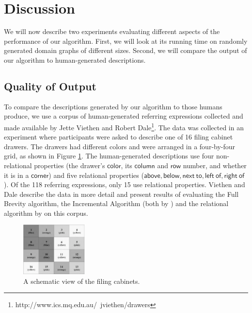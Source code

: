 \section{Discussion} \label{sec:discussion}

We will now describe two experiments evaluating different aspects of
the performance of our algorithm. First, we will look at its running
time on randomly generated domain graphs of different sizes. Second,
we will compare the output of our algorithm to human-generated
descriptions.



\subsection{Quality of Output}

To compare the descriptions generated by our algorithm to
those humans produce, we use a corpus of
human-generated referring expressions collected and made available by
Jette Viethen and Robert
Dale\footnote{http://www.ics.mq.edu.au/~jviethen/drawers}.  The data
was collected in an experiment where participants were asked to
describe one of 16 filing cabinet drawers. The drawers had different
colors and were arranged in a four-by-four grid, as shown in Figure
\ref{fig:drawers}. The human-generated descriptions use four
non-relational properties (the drawer's $\mathsf{color}$, its $\mathsf{column}$ and
$\mathsf{row}$ number, and whether it is in a $\mathsf{corner}$) and five
relational properties ($\mathsf{above, below, next\ to, left\ of,
right\ of}$). Of the 118 referring expressions, only 15 use relational properties.
Viethen and Dale 
describe the data in more detail and present results of evaluating the
Full Brevity algorithm, the Incremental Algorithm (both by
\cite{Dale1995}) and the relational algorithm by
\cite{dale91:_gener_refer_expres_invol_relat} on this corpus.


\begin{figure}
\includegraphics[width=0.3\textwidth]{drawers}
\caption{A schematic view of the filing cabinets.}\label{fig:drawers}
\end{figure}


